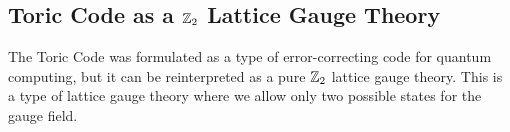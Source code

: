 %
%
%


%
%
\subsection{Toric Code as a \texorpdfstring{$\mathbb{Z}_2$}{Z2} Lattice Gauge Theory}
\label{sub:toric_code_as_a_z2_lattice_gauge_theory}

The Toric Code was formulated as a type of error-correcting code for quantum computing, but it can be reinterpreted as a pure $\mathbb{Z}_2$ lattice gauge theory.
This is a type of lattice gauge theory where we allow only two possible states for the gauge field.

